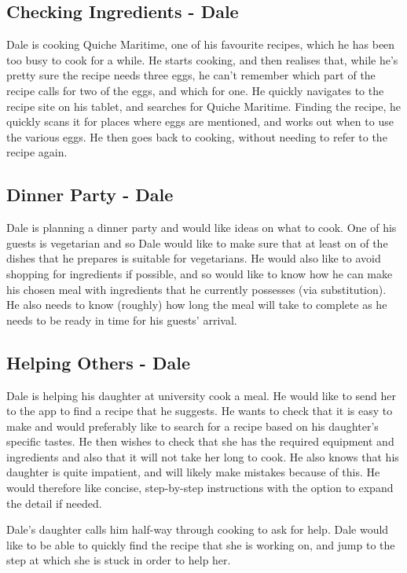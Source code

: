 \documentclass{article}
\begin{document}
\subsection*{Checking Ingredients - Dale}
Dale is cooking Quiche Maritime, one of his favourite recipes, which he has been
too busy to cook for a while. He starts cooking, and then realises that, while
he's pretty sure the recipe needs three eggs, he can't remember which part of the
recipe calls for two of the eggs, and which for one. He quickly navigates to the
recipe site on his tablet, and searches for Quiche Maritime. Finding the recipe,
he quickly scans it for places where eggs are mentioned, and works out when to
use the various eggs. He then goes back to cooking, without needing to refer to
the recipe again.

\subsection*{Dinner Party - Dale}
Dale is planning a dinner party and would like ideas on what to cook. One of his
guests is vegetarian and so Dale would like to make sure that at least on of the
dishes that he prepares is suitable for vegetarians. He would also like to avoid
shopping for ingredients if possible, and so would like to know how he can make
his chosen meal with ingredients that he currently possesses (via substitution).
He also needs to know (roughly) how long the meal will take to complete as he 
needs to be ready in time for his guests' arrival.

\subsection*{Helping Others - Dale}
Dale is helping his daughter at university cook a meal. He would like to send her
to the app to find a recipe that he suggests. He wants to check that it is easy 
to make and would preferably like to search for a recipe based on his daughter's
specific tastes. He then wishes to check that she has the required equipment and
ingredients and also that it will not take her long to cook. He also knows that 
his daughter is quite impatient, and will likely make mistakes because of this.
He would therefore like concise, step-by-step instructions with the option to
expand the detail if needed.

Dale's daughter calls him half-way through cooking to ask for help. Dale would 
like to be able to quickly find the recipe that she is working on, and jump to 
the step at which she is stuck in order to help her.
\end{document}
